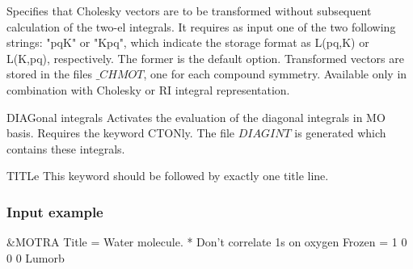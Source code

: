 \begin{keywordlist}
Specifies that Cholesky vectors are to be transformed without subsequent calculation of the two-el integrals.
It requires as input one of the two following strings: "pqK" or "Kpq", which indicate the storage format as
L(pq,K) or L(K,pq), respectively. The former is the default option. Transformed vectors are stored in the files $\_CHMOT$,
one for each compound symmetry.
Available only in combination with Cholesky or RI integral representation.
\item[DIAGonal integrals]
Activates the evaluation of the diagonal integrals in MO basis. Requires the keyword CTONly.
The file $DIAGINT$ is generated which contains these integrals.
\item[TITLe]
This keyword should be followed by exactly one title line.
\end{keywordlist}

\subsubsection{Input example}
\begin{inputlisting}
 &MOTRA
Title  =  Water molecule.
* Don't correlate 1s on oxygen
Frozen =  1 0 0 0
Lumorb
\end{inputlisting}
